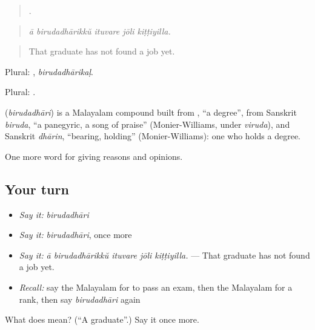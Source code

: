 \begin{quote}
    .
\end{quote}

\begin{quote}
\emph{ā birudadhārikkŭ ituvare jōli kiṭṭiyilla.}
\end{quote}

\begin{quote}
That graduate has not found a job yet.
\end{quote}

Plural: , \emph{birudadhārikaḷ}.

Plural: .

\begin{cousinweb}
\textbf{} (\emph{birudadhāri}) is a Malayalam compound built from , \textquotedblleft{}a degree\textquotedblright{}, from Sanskrit \emph{biruda}, \textquotedblleft{}a panegyric, a song of praise\textquotedblright{} (Monier-Williams, under \emph{viruda}), and Sanskrit \emph{dhārin}, \textquotedblleft{}bearing, holding\textquotedblright{} (Monier-Williams): one who holds a degree.
\end{cousinweb}

\begin{grammarlens}[title={What you've built}]
One more word for giving reasons and opinions.
\end{grammarlens}

\subsection*{Your turn}
\begin{itemize}
\raggedright
  \item \emph{Say it:} \emph{birudadhāri}
  \item \emph{Say it:} \emph{birudadhāri}, once more
  \item \emph{Say it:} \emph{ā birudadhārikkŭ ituvare jōli kiṭṭiyilla.} — That graduate has not found a job yet.
  \item \emph{Recall:} say the Malayalam for to pass an exam, then the Malayalam for a rank, then say \emph{birudadhāri} again
\end{itemize}

\begin{tcolorbox}[breakable,colback=teal!4,colframe=teal!35!black,title={Before you move on}]
What does  mean? (\textquotedblleft{}A graduate\textquotedblright{}.) Say it once more.
\end{tcolorbox}
